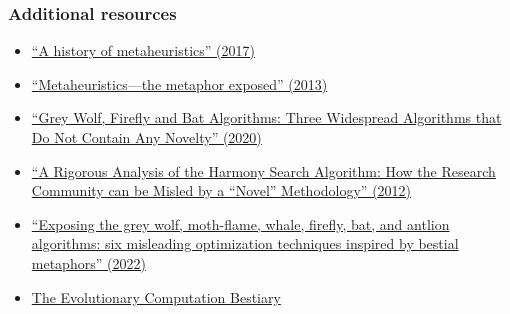 \documentclass[letterpaper, 12pt]{article}
\begin{document}
\subsubsection*{Additional resources}

\begin{itemize}
    \setlength\itemsep{-0.5em}
    \item \href{https://doi.org/10.48550/arXiv.1704.00853}{``A history of metaheuristics'' (2017)}
    \item \href{https://doi.org/10.1111/itor.12001}{``Metaheuristics—the metaphor exposed'' (2013)}
    \item \href{https://doi.org/10.1007/978-3-030-60376-2_10}{``Grey Wolf, Firefly and Bat Algorithms: Three Widespread Algorithms that Do Not Contain Any Novelty'' (2020)}
    \item \href{https://doi.org/10.4018/978-1-4666-0270-0.ch005}{``A Rigorous Analysis of the Harmony Search Algorithm: How the Research Community can be Misled by a “Novel” Methodology'' (2012)}
    \item \href{https://doi.org/10.1111/itor.13176}{``Exposing the grey wolf, moth-flame, whale, firefly, bat, and antlion algorithms: six misleading optimization techniques inspired by bestial metaphors'' (2022)}
    \item \href{https://fcampelo.github.io/EC-Bestiary/}{The Evolutionary Computation Bestiary}
\end{itemize}
\end{document}
